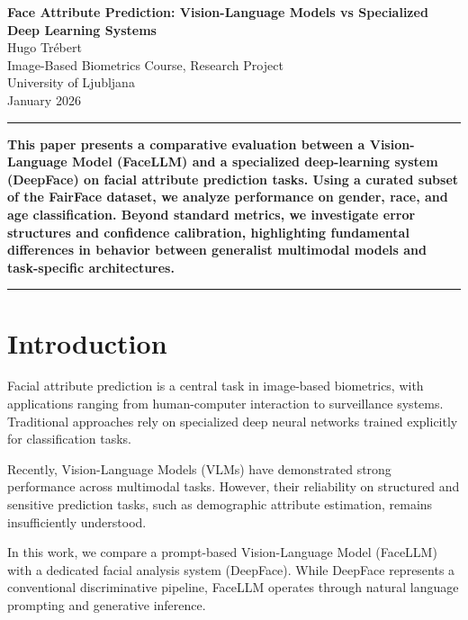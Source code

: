 \documentclass[a4paper,11pt,twocolumn]{article}
\begin{document}
\thispagestyle{empty}

\begin{center}
{\Large \textbf{Face Attribute Prediction: Vision-Language Models vs Specialized Deep Learning Systems}}\\[6pt]
{\large Hugo Trébert}\\[4pt]
Image-Based Biometrics Course, Research Project\\[4pt]
University of Ljubljana\\[4pt]
January 2026
\end{center}

\vspace{0.3cm}
\hrule
\vspace{0.3cm}

\textbf{This paper presents a comparative evaluation between a Vision-Language Model (FaceLLM) and a specialized deep-learning system (DeepFace) on facial attribute prediction tasks. Using a curated subset of the FairFace dataset, we analyze performance on gender, race, and age classification. Beyond standard metrics, we investigate error structures and confidence calibration, highlighting fundamental differences in behavior between generalist multimodal models and task-specific architectures.}

\vspace{0.3cm}
\hrule
\vspace{0.3cm}


\section{Introduction}

Facial attribute prediction is a central task in image-based biometrics, with applications ranging from human-computer interaction to surveillance systems. Traditional approaches rely on specialized deep neural networks trained explicitly for classification tasks.

Recently, Vision-Language Models (VLMs) have demonstrated strong performance across multimodal tasks. However, their reliability on structured and sensitive prediction tasks, such as demographic attribute estimation, remains insufficiently understood.

In this work, we compare a prompt-based Vision-Language Model (FaceLLM) with a dedicated facial analysis system (DeepFace). While DeepFace represents a conventional discriminative pipeline, FaceLLM operates through natural language prompting and generative inference.
\end{document}

